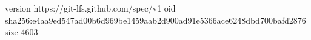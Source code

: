version https://git-lfs.github.com/spec/v1
oid sha256:e4aa9ed547ad00b6d969be1459aab2d900ad91e5366ace6248dbd700bafd2876
size 4603
